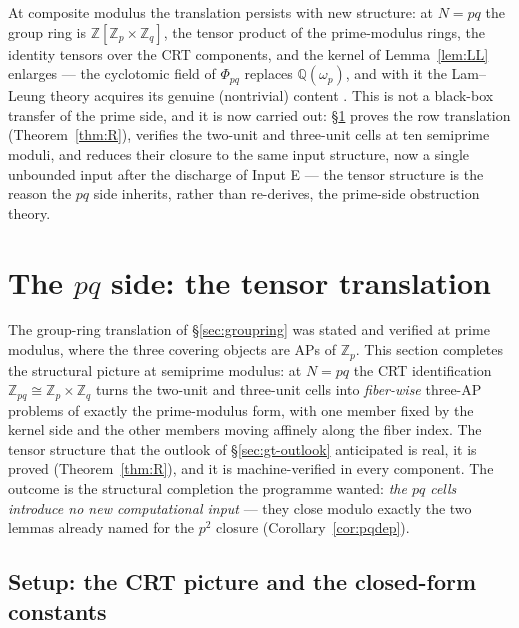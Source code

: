 \documentclass[11pt,a4paper]{article}
\numberwithin{equation}{section}
\theoremstyle{plain}
\theoremstyle{definition}
\theoremstyle{remark}
\newcommand{\Z}{\mathbb{Z}}
\begin{document}
At composite modulus the translation persists with new structure: at
$N=pq$ the group ring is $\Z[\Z_p\times\Z_q]$, the tensor product of the
prime-modulus rings, the identity tensors over the CRT components, and the
kernel of Lemma~\ref{lem:LL} enlarges --- the cyclotomic field of $\Phi_{pq}$
replaces $\mathbb{Q}(\omega_p)$, and with it the Lam--Leung theory acquires its
genuine (nontrivial) content \cite{LamLeung}. This is not a black-box
transfer of the prime side, and it is now carried out: \S\ref{sec:pq}
proves the row translation (Theorem~\ref{thm:R}), verifies the two-unit
and three-unit cells at ten semiprime moduli, and reduces their closure to
the same input structure, now a single unbounded input after the discharge
of Input E --- the tensor structure is the reason the $pq$ side
inherits, rather than re-derives, the prime-side obstruction theory.


\section{The $pq$ side: the tensor translation}\label{sec:pq}

The group-ring translation of \S\ref{sec:groupring} was stated and verified at
prime modulus, where the three covering objects are APs of $\Z_p$. This
section completes the structural picture at semiprime modulus: at $N=pq$ the
CRT identification $\Z_{pq}\cong\Z_p\times\Z_q$ turns the two-unit and
three-unit cells into \emph{fiber-wise} three-AP problems of exactly the
prime-modulus form, with one member fixed by the kernel side and the other
members moving affinely along the fiber index. The tensor structure that the
outlook of \S\ref{sec:gt-outlook} anticipated is real, it is proved
(Theorem~\ref{thm:R}), and it is machine-verified in every component. The
outcome is the structural completion the programme wanted: \emph{the $pq$
cells introduce no new computational input} --- they close modulo exactly the
two lemmas already named for the $p^2$ closure (Corollary~\ref{cor:pqdep}).

\subsection{Setup: the CRT picture and the closed-form constants}
\label{sec:pq-setup}
\end{document}
